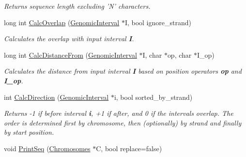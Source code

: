 \begin{CompactItemize}
\begin{CompactList}\small\item\em Returns sequence length excluding 'N' characters. \item\end{CompactList}\item 
\hypertarget{classGenomicInterval_ea112f495d21eda675de671d9ff2e5ad}{
long int \hyperlink{classGenomicInterval_ea112f495d21eda675de671d9ff2e5ad}{CalcOverlap} (\hyperlink{classGenomicInterval}{GenomicInterval} $\ast$I, bool ignore\_\-strand)}
\label{classGenomicInterval_ea112f495d21eda675de671d9ff2e5ad}

\begin{CompactList}\small\item\em Calculates the overlap with input interval {\bf I}. \item\end{CompactList}\item 
\hypertarget{classGenomicInterval_a801336aa07a0029d97d7914a747abd3}{
long int \hyperlink{classGenomicInterval_a801336aa07a0029d97d7914a747abd3}{CalcDistanceFrom} (\hyperlink{classGenomicInterval}{GenomicInterval} $\ast$I, char $\ast$op, char $\ast$I\_\-op)}
\label{classGenomicInterval_a801336aa07a0029d97d7914a747abd3}

\begin{CompactList}\small\item\em Calculates the distance from input interval {\bf I} based on position operators {\bf op} and {\bf I\_\-op}. \item\end{CompactList}\item 
\hypertarget{classGenomicInterval_7856012eda653222a1ac5482510bacc7}{
int \hyperlink{classGenomicInterval_7856012eda653222a1ac5482510bacc7}{CalcDirection} (\hyperlink{classGenomicInterval}{GenomicInterval} $\ast$i, bool sorted\_\-by\_\-strand)}
\label{classGenomicInterval_7856012eda653222a1ac5482510bacc7}

\begin{CompactList}\small\item\em Returns -1 if before interval {\bf i}, +1 if after, and 0 if the intervals overlap. The order is determined first by chromosome, then (optionally) by strand and finally by start position. \item\end{CompactList}\item 
\hypertarget{classGenomicInterval_b14f526a4df4f148e1b843ee0dc10d04}{
void \hyperlink{classGenomicInterval_b14f526a4df4f148e1b843ee0dc10d04}{PrintSeq} (\hyperlink{classChromosomes}{Chromosomes} $\ast$C, bool replace=false)}
\label{classGenomicInterval_b14f526a4df4f148e1b843ee0dc10d04}


\end{CompactItemize}
